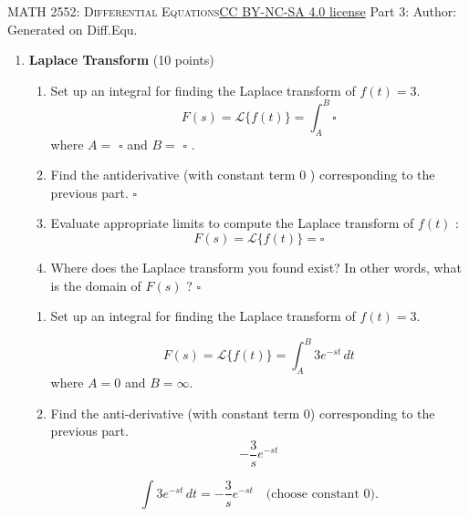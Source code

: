 \newpage\handout
{\textsc{MATH 2552: Differential Equations}}{\href{https://creativecommons.org/licenses/by-nc-sa/4.0/}{CC BY-NC-SA 4.0 license}}
{Part 3: }
{Author: \href{\HandoutAuthorUrl}{\HandoutAuthor}}{Generated on \generatedOn}
{Diff.Equ.}

\newpage




\begin{enumerate}


  \item \textbf{Laplace Transform} (10 points)\\
  \begin{enumerate}[label=(\alph*)]
    \item Set up an integral for finding the Laplace transform of $f(t)=3$.
    $$
    F(s)=\mathcal{L}\{f(t)\}=\int_A^B \square
    $$
    where $A=$ $\square$ and $B=$ $\square$ .
    \begin{subanswer}
    \end{subanswer}
    \item Find the antiderivative (with constant term 0 ) corresponding to the previous part.
    $\square$
    \begin{subanswer}
    \end{subanswer}
    \item Evaluate appropriate limits to compute the Laplace transform of $f(t)$ :
    $$
    F(s)=\mathcal{L}\{f(t)\}=\square
    $$
    \begin{subanswer}
    \end{subanswer}
    \item Where does the Laplace transform you found exist? In other words, what is the domain of $F(s)$ ?
    $\square$
    \begin{subanswer}
    \end{subanswer}
  \end{enumerate}



\begin{enumerate}[label=(\alph*)]
  \item Set up an integral for finding the Laplace transform of $f(t)=3$.
  \begin{subanswer}
    $$
    F(s)=\mathcal{L}\{f(t)\}=\int_{A}^{B} 3e^{-st}\,dt
    $$
    where $A=\displaystyle 0$ and $B=\displaystyle \infty$.
  \end{subanswer}

  \item Find the anti-derivative (with constant term $0$) corresponding to the previous part.
  \[
    -\frac{3}{s}e^{-st}
  \]
  \begin{subanswer}
    \[
      \int 3e^{-st}\,dt = -\frac{3}{s}e^{-st} \quad\text{(choose constant }0\text{).}
    \]
  \end{subanswer}


\end{enumerate}
\end{enumerate}
